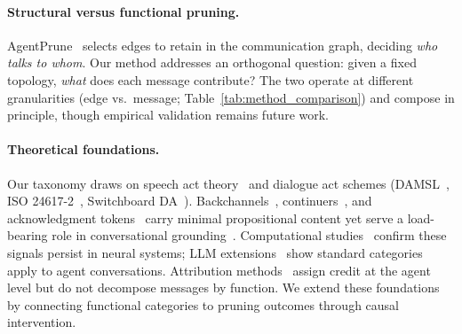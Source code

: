 \paragraph{Structural versus functional pruning.}
AgentPrune~\citep{zhang_agentprune_2025} selects edges to retain in the communication graph, deciding \emph{who talks to whom}. Our method addresses an orthogonal question: given a fixed topology, \emph{what} does each message contribute? The two operate at different granularities (edge vs.\ message; Table~\ref{tab:method_comparison}) and compose in principle, though empirical validation remains future work.

\paragraph{Theoretical foundations.}
Our taxonomy draws on speech act theory~\citep{austin_how_1962, searle_speech_acts_1969} and dialogue act schemes (DAMSL~\citep{core_damsl_1997}, ISO 24617-2~\citep{bunt_iso_2012}, Switchboard DA~\citep{stolcke_dialogue_acts_2000}). Backchannels~\citep{yngve_getting_1970}, continuers~\citep{schegloff_discourse_1982}, and acknowledgment tokens~\citep{jefferson_acknowledgment_1984} carry minimal propositional content yet serve a load-bearing role in conversational grounding~\citep{clark_contributing_1989}. Computational studies~\citep{inoue_backchannel_2025, qian_backchannel_2026} confirm these signals persist in neural systems; LLM extensions~\citep{qamar_dialogue_acts_2025, zhang_communication_strategies_2025} show standard categories apply to agent conversations. Attribution methods~\citep{xia_hivemind_2026, horovicz_agentshap_2025, cemri_mast_2025} assign credit at the agent level but do not decompose messages by function. We extend these foundations by connecting functional categories to pruning outcomes through causal intervention.
